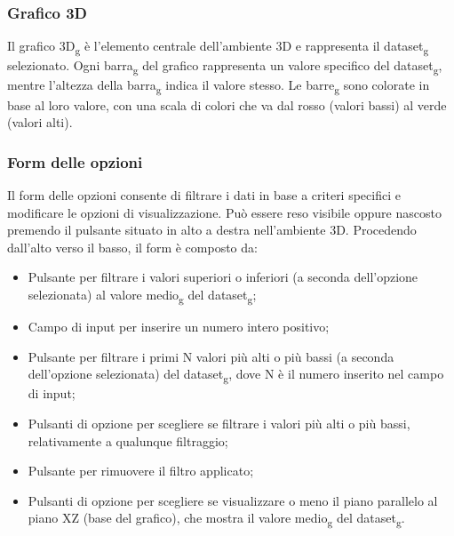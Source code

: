 \subsubsection{Grafico 3D}
Il grafico 3D\textsubscript{g} è l'elemento centrale dell'ambiente 3D e rappresenta il dataset\textsubscript{g}
selezionato. Ogni barra\textsubscript{g} del grafico rappresenta un valore specifico del
dataset\textsubscript{g}, mentre l'altezza della barra\textsubscript{g} indica il valore stesso. Le barre\textsubscript{g} sono
colorate in base al loro valore, con una scala di colori che va dal rosso
(valori bassi) al verde (valori alti).

\subsubsection{Form delle opzioni}
Il form delle opzioni consente di filtrare i dati in base a criteri specifici e
modificare le opzioni di visualizzazione. Può essere reso visibile oppure
nascosto premendo il pulsante situato in alto a destra nell'ambiente 3D.
Procedendo dall'alto verso il basso, il form è composto da:
\begin{itemize}
    \item Pulsante per filtrare i valori superiori o inferiori (a seconda dell'opzione
          selezionata) al valore medio\textsubscript{g} del dataset\textsubscript{g};
    \item Campo di input per inserire un numero intero positivo;
    \item Pulsante per filtrare i primi N valori più alti o più bassi (a seconda
          dell'opzione selezionata) del dataset\textsubscript{g}, dove N è il numero inserito nel campo di
          input;
    \item Pulsanti di opzione per scegliere se filtrare i valori più alti o più bassi,
          relativamente a qualunque filtraggio;
    \item Pulsante per rimuovere il filtro applicato;
    \item Pulsanti di opzione per scegliere se visualizzare o meno il piano parallelo al
          piano XZ (base del grafico), che mostra il valore medio\textsubscript{g} del dataset\textsubscript{g}.
\end{itemize}
